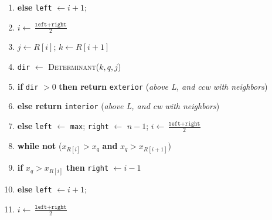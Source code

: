 \documentclass [12pt]{article}
\begin{document}
\begin{enumerate}[label=(\alph*)]
\begin{enumerate}[label=\arabic*.]
                \item \hspace{2cm} \textbf{else} \texttt{left} $\leftarrow i+ 1$;
                
                \item \hspace{2cm} $i\leftarrow \frac{\texttt{left} + \texttt{right}}{2}$
                
                \item \hspace{1cm} $j\leftarrow R[i]$; $k\leftarrow R[i+1]$
                
                \item \hspace{1cm} \texttt{dir} $\leftarrow$ \textsc{Determinant}($k, q, j$)
                \item \hspace{1cm} \textbf{if} \texttt{dir} $> 0$ \textbf{then return} \texttt{exterior} \hspace{0.25cm} (\emph{above L, and ccw with neighbors})
                \item \hspace{1cm} \textbf{else return} \texttt{interior} \hspace{2cm} (\emph{above L, and cw with neighbors})
                


                
                \item \textbf{else}  \texttt{left} $\leftarrow$ \texttt{max}; \texttt{right} $\leftarrow$ $n - 1$; $i\leftarrow \frac{\texttt{left} + \texttt{right}}{2}$
                
                \item \hspace{1cm} \textbf{while not} ($x_{R[i]} > x_q$ \textbf{and} $x_q > x_{R[i+1]}$)
                
                \item \hspace{2cm} \textbf{if} $x_q > x_{R[i]}$ \textbf{then} \texttt{right} $\leftarrow i - 1$ 
                
                \item \hspace{2cm} \textbf{else} \texttt{left} $\leftarrow i + 1$;
                
                \item \hspace{2cm} $i\leftarrow \frac{\texttt{left} + \texttt{right}}{2}$
                

\end{enumerate}
\end{enumerate}
\end{document}
